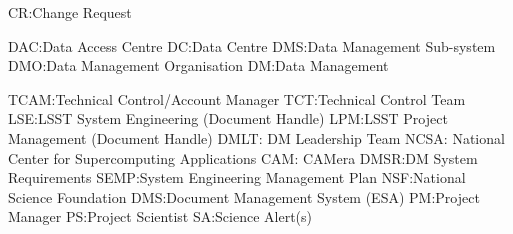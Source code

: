 CR:Change Request

DAC:Data Access Centre
DC:Data Centre
DMS:Data Management Sub-system
DMO:Data Management Organisation
DM:Data Management

TCAM:Technical Control/Account Manager
TCT:Technical Control Team
LSE:LSST System Engineering (Document Handle)
LPM:LSST Project Management (Document Handle)
DMLT: DM Leadership Team
NCSA: National Center for Supercomputing Applications
CAM: CAMera
DMSR:DM System Requirements
SEMP:System Engineering Management Plan
NSF:National Science Foundation
DMS:Document Management System (ESA)
PM:Project Manager
PS:Project Scientist
SA:Science Alert(s)

